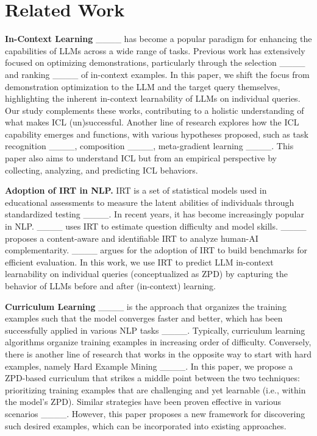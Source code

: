 \section{Related Work}
\noindent \textbf{In-Context Learning} ____ has become a popular paradigm for enhancing the capabilities of LLMs across a wide range of tasks. 
Previous work has extensively focused on optimizing demonstrations, particularly through the selection ____ and ranking ____ of in-context examples. 
In this paper, we shift the focus from demonstration optimization to the LLM and the target query themselves, highlighting the inherent in-context learnability of LLMs on individual queries. 
Our study complements these works, contributing to a holistic understanding of what makes ICL (un)successful.
Another line of research explores how the ICL capability emerges and functions, with various hypotheses proposed, such as task recognition ____, composition ____, meta-gradient learning ____. 
This paper also aims to understand ICL but from an empirical perspective by collecting, analyzing, and predicting ICL behaviors.

\vspace{1.5mm}
\noindent \textbf{Adoption of IRT in NLP.}
IRT is a set of statistical models used in educational assessments to measure the latent abilities of individuals through standardized testing ____. 
In recent years, it has become increasingly popular in NLP. 
____ uses IRT to estimate question difficulty and model
skills. 
____ proposes a content-aware and identifiable IRT to analyze human-AI complementarity. 
____ argues for the adoption of IRT to build benchmarks for efficient evaluation.
In this work, we use IRT to predict LLM in-context learnability on individual queries (conceptualized as ZPD) by capturing the behavior of LLMs before and after (in-context) learning.

\vspace{1.5mm}
\noindent \textbf{Curriculum Learning} ____ is the approach that organizes the training examples such that the model converges faster and better, which has been successfully applied in various NLP tasks ____. 
Typically, curriculum learning algorithms organize training examples in increasing order of difficulty. 
Conversely, there is another line of research that works in the opposite way to start with hard examples, namely Hard Example Mining ____. 
In this paper, we propose a ZPD-based curriculum that strikes a middle point between the two techniques: prioritizing training examples that are challenging and yet learnable (i.e., within the model's ZPD).
Similar strategies have been proven effective in various scenarios ____. 
However, this paper proposes a new framework for discovering such desired examples, which can be incorporated into existing approaches.